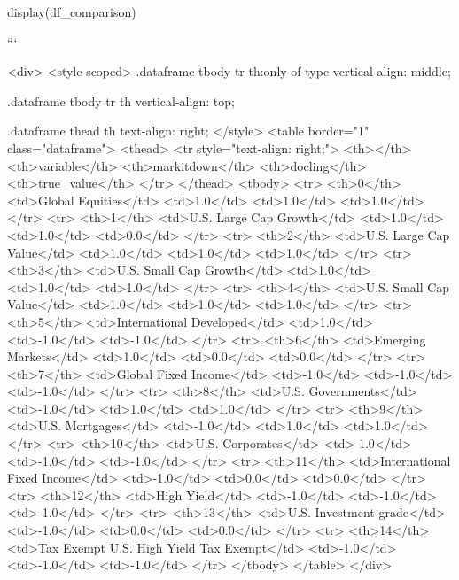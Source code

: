display(df_comparison)

```


<div>
<style scoped>
    .dataframe tbody tr th:only-of-type {
        vertical-align: middle;
    }

    .dataframe tbody tr th {
        vertical-align: top;
    }

    .dataframe thead th {
        text-align: right;
    }
</style>
<table border="1" class="dataframe">
  <thead>
    <tr style="text-align: right;">
      <th></th>
      <th>variable</th>
      <th>markitdown</th>
      <th>docling</th>
      <th>true_value</th>
    </tr>
  </thead>
  <tbody>
    <tr>
      <th>0</th>
      <td>Global Equities</td>
      <td>1.0</td>
      <td>1.0</td>
      <td>1.0</td>
    </tr>
    <tr>
      <th>1</th>
      <td>U.S. Large Cap Growth</td>
      <td>1.0</td>
      <td>1.0</td>
      <td>0.0</td>
    </tr>
    <tr>
      <th>2</th>
      <td>U.S. Large Cap Value</td>
      <td>1.0</td>
      <td>1.0</td>
      <td>1.0</td>
    </tr>
    <tr>
      <th>3</th>
      <td>U.S. Small Cap Growth</td>
      <td>1.0</td>
      <td>1.0</td>
      <td>1.0</td>
    </tr>
    <tr>
      <th>4</th>
      <td>U.S. Small Cap Value</td>
      <td>1.0</td>
      <td>1.0</td>
      <td>1.0</td>
    </tr>
    <tr>
      <th>5</th>
      <td>International Developed</td>
      <td>1.0</td>
      <td>-1.0</td>
      <td>-1.0</td>
    </tr>
    <tr>
      <th>6</th>
      <td>Emerging Markets</td>
      <td>1.0</td>
      <td>0.0</td>
      <td>0.0</td>
    </tr>
    <tr>
      <th>7</th>
      <td>Global Fixed Income</td>
      <td>-1.0</td>
      <td>-1.0</td>
      <td>-1.0</td>
    </tr>
    <tr>
      <th>8</th>
      <td>U.S. Governments</td>
      <td>-1.0</td>
      <td>1.0</td>
      <td>1.0</td>
    </tr>
    <tr>
      <th>9</th>
      <td>U.S. Mortgages</td>
      <td>-1.0</td>
      <td>1.0</td>
      <td>1.0</td>
    </tr>
    <tr>
      <th>10</th>
      <td>U.S. Corporates</td>
      <td>-1.0</td>
      <td>-1.0</td>
      <td>-1.0</td>
    </tr>
    <tr>
      <th>11</th>
      <td>International Fixed Income</td>
      <td>-1.0</td>
      <td>0.0</td>
      <td>0.0</td>
    </tr>
    <tr>
      <th>12</th>
      <td>High Yield</td>
      <td>-1.0</td>
      <td>-1.0</td>
      <td>-1.0</td>
    </tr>
    <tr>
      <th>13</th>
      <td>U.S. Investment-grade</td>
      <td>-1.0</td>
      <td>0.0</td>
      <td>0.0</td>
    </tr>
    <tr>
      <th>14</th>
      <td>Tax Exempt U.S. High Yield Tax Exempt</td>
      <td>-1.0</td>
      <td>-1.0</td>
      <td>-1.0</td>
    </tr>
  </tbody>
</table>
</div>



